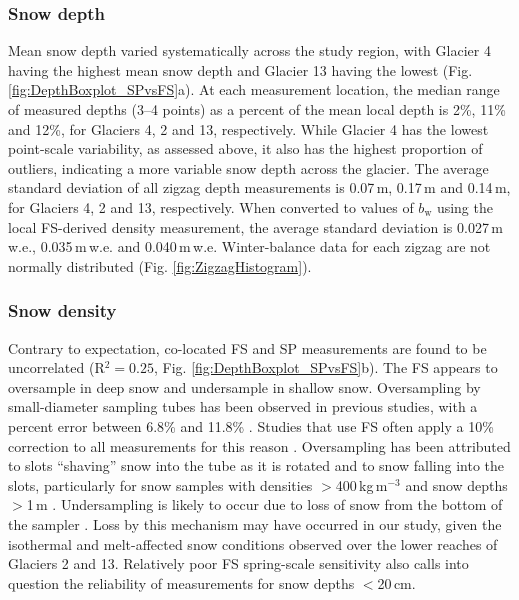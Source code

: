 \documentclass[review,oneside, letterpaper]{igs}
\begin{document}
\subsubsection{Snow depth}
Mean snow depth varied systematically across the study region, with Glacier 4 having the highest mean snow depth and Glacier 13 having the lowest (Fig. \ref{fig:DepthBoxplot_SPvsFS}a). At each measurement location, the median range of measured depths (3--4 points) as a percent of the mean local depth is 2\%, 11\% and 12\%, for Glaciers 4, 2 and 13, respectively. While Glacier 4 has the lowest point-scale variability, as assessed above, it also has the highest proportion of outliers, indicating a more variable snow depth across the glacier. The average standard deviation of all zigzag depth measurements is 0.07\,m, 0.17\,m and 0.14\,m, for Glaciers 4, 2 and 13, respectively. When converted to values of $b_\mathrm{w}$ using the local FS-derived density measurement, the average standard deviation is 0.027\,m\,w.e., 0.035\,m\,w.e. and 0.040\,m\,w.e. Winter-balance data for each zigzag are not normally distributed (Fig. \ref{fig:ZigzagHistogram}).

\subsubsection{Snow density}

Contrary to expectation, co-located FS and SP measurements are found to be uncorrelated (R$^2=0.25$, Fig. \ref{fig:DepthBoxplot_SPvsFS}b). The FS appears to oversample in deep snow and undersample in shallow snow. Oversampling by small-diameter sampling tubes has been observed in previous studies, with a percent error between 6.8\% and 11.8\% \citep[e.g.][]{Work1965, Fames1982, Conger2009}. Studies that use FS often apply a 10\% correction to all measurements for this reason \citep[e.g.][]{Molotch2005}. Oversampling has been attributed to slots ``shaving'' snow into the tube as it is rotated \citep[e.g.][]{Dixon2012} and to snow falling into the slots, particularly for snow samples with densities $>$400\,kg\,m$^{-3}$ and snow depths $>$1\,m \citep[e.g.][]{Beaumont1963}. Undersampling is likely to occur due to loss of snow from the bottom of the sampler \citep{Turcan1975}. Loss by this mechanism may have occurred in our study, given the isothermal and melt-affected snow conditions observed over the lower reaches of Glaciers 2 and 13. Relatively poor FS spring-scale sensitivity also calls into question the reliability of measurements for snow depths $<$20\,cm.
\end{document}
